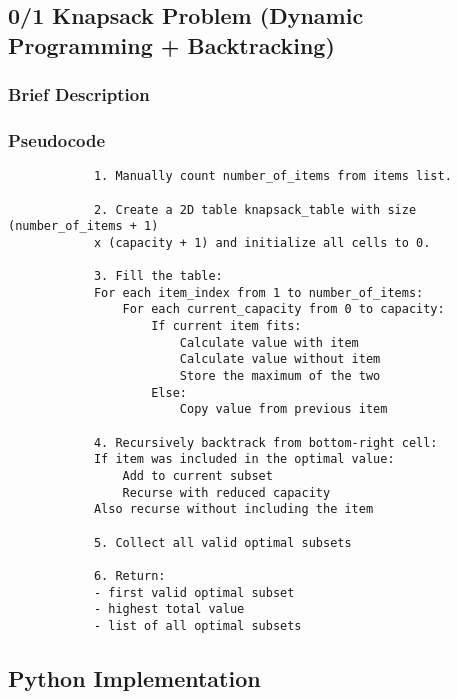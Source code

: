\documentclass{article}
\begin{document}
\subsection{0/1 Knapsack Problem (Dynamic Programming + Backtracking)}
\subsubsection*{Brief Description}
\subsubsection*{Pseudocode}
\begin{lstlisting}
            1. Manually count number_of_items from items list.

            2. Create a 2D table knapsack_table with size (number_of_items + 1) 
            x (capacity + 1) and initialize all cells to 0.
            
            3. Fill the table:
            For each item_index from 1 to number_of_items:
                For each current_capacity from 0 to capacity:
                    If current item fits:
                        Calculate value with item
                        Calculate value without item
                        Store the maximum of the two
                    Else:
                        Copy value from previous item

            4. Recursively backtrack from bottom-right cell:
            If item was included in the optimal value:
                Add to current subset
                Recurse with reduced capacity
            Also recurse without including the item

            5. Collect all valid optimal subsets

            6. Return:
            - first valid optimal subset
            - highest total value
            - list of all optimal subsets
\end{lstlisting}

\subsection*{Python Implementation}
\end{document}
